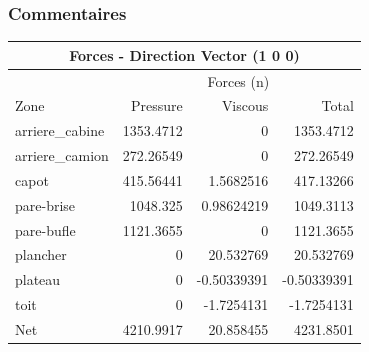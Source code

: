 \documentclass[handout]{beamer}
\begin{document}
\begin{frame}
	\frametitle{Commentaires}
	\begin{center}\begin{tabular}{|l|r r r|}
	\hline
	\multicolumn{4}{|c|}{Forces - Direction Vector (1 0 0)} \\
	\hline
			&   \multicolumn{3}{c|}{Forces (n)} \\
	\hline
	Zone                &     Pressure    &   Viscous     &   Total      \\
	\hline
	arriere\_cabine      &     1353.4712   &   0           &   1353.4712  \\
	arriere\_camion     &      272.26549   &   0           &   272.26549  \\ 
	capot               &     415.56441    &  1.5682516    &  417.13266   \\
	pare-brise          &     1048.325     &  0.98624219   &  1049.3113   \\
	pare-bufle          &     1121.3655    &  0            &  1121.3655   \\
	plancher            &     0            &  20.532769    &  20.532769   \\
	plateau             &     0            &  -0.50339391  &  -0.50339391 \\
	toit                &     0            &  -1.7254131   &  -1.7254131  \\
	\hline
	\hline
	Net                 &     4210.9917    &  20.858455    &  4231.8501   \\
	\hline
	\end{tabular}\end{center}
\end{frame}
\end{document}
